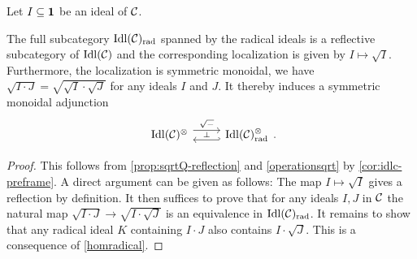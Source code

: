 \documentclass[10pt,a4paper,oneside]{article}
\begin{document}
\begin{de}\label{def:radprimeideal}
Let $I\subseteq\mathbf{1}$ be an ideal of $\mathcal{C}$.

\end{de}

\begin{prop}\label{prop:idlcrad-localization}
The full subcategory $\operatorname{Idl}(\mathcal{C})_{\operatorname{rad}}$ spanned by the radical ideals is a reflective subcategory of $\operatorname{Idl}(\mathcal{C})$ and the corresponding localization is given by $I\mapsto \sqrt{I}$. Furthermore, the localization is symmetric monoidal, \ie we have $\sqrt{I\cdot J}=\sqrt{\sqrt{I}\cdot \sqrt{J}}$ for any ideals $I$ and $J$. It thereby induces a symmetric monoidal adjunction 
$$\begin{tikzcd}
\idlc^\otimes \arrow[r, "\sqrt{-}", shift left=1ex]   & \arrow[l,"\perp"', hook', shift left=1ex] \idlc_{\op{rad}}^\otimes
\end{tikzcd} .$$
\end{prop}

\begin{proof}
This follows from \cref{prop:sqrtQ-reflection} and \cref{operationsqrt} by \cref{cor:idlc-preframe}. A direct argument can be given as follows: The map $I\mapsto \sqrt{I}$ gives a reflection by definition. It then suffices to prove that for any ideals $I,J$ in $\mathcal{C}$ the natural map $\sqrt{I\cdot J}\to \sqrt{I\cdot \sqrt{J}}$ is an equivalence in $\operatorname{Idl}(\mathcal{C})_{\operatorname{rad}}$. It remains to show that any radical ideal $K$ containing $I\cdot J$ also contains $I\cdot \sqrt{J}$. This is a consequence of \cref{homradical}.
\end{proof}
\end{document}
